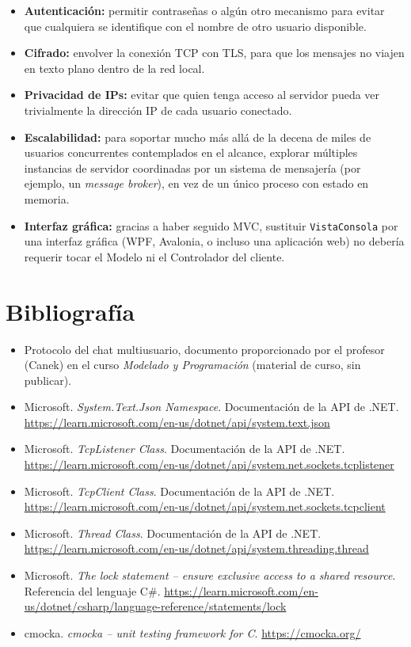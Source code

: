 \documentclass[11pt,letterpaper]{article}
\begin{document}
\begin{itemize}
  \item \textbf{Autenticación:} permitir contraseñas o algún otro mecanismo
        para evitar que cualquiera se identifique con el nombre de otro
        usuario disponible.
  \item \textbf{Cifrado:} envolver la conexión TCP con TLS, para que los
        mensajes no viajen en texto plano dentro de la red local.
  \item \textbf{Privacidad de IPs:} evitar que quien tenga acceso al
        servidor pueda ver trivialmente la dirección IP de cada usuario
        conectado.
  \item \textbf{Escalabilidad:} para soportar mucho más allá de la decena
        de miles de usuarios concurrentes contemplados en el alcance,
        explorar múltiples instancias de servidor coordinadas por un
        sistema de mensajería (por ejemplo, un \emph{message broker}), en
        vez de un único proceso con estado en memoria.
  \item \textbf{Interfaz gráfica:} gracias a haber seguido MVC, sustituir
        \texttt{VistaConsola} por una interfaz gráfica (WPF, Avalonia, o
        incluso una aplicación web) no debería requerir tocar el Modelo ni
        el Controlador del cliente.
\end{itemize}

\section{Bibliografía}

\begin{itemize}
  \item Protocolo del chat multiusuario, documento proporcionado por el
        profesor (Canek) en el curso \emph{Modelado y Programación}
        (material de curso, sin publicar).
  \item Microsoft. \emph{System.Text.Json Namespace}. Documentación de la
        API de .NET.
        \url{https://learn.microsoft.com/en-us/dotnet/api/system.text.json}
  \item Microsoft. \emph{TcpListener Class}. Documentación de la API de
        .NET.
        \url{https://learn.microsoft.com/en-us/dotnet/api/system.net.sockets.tcplistener}
  \item Microsoft. \emph{TcpClient Class}. Documentación de la API de
        .NET.
        \url{https://learn.microsoft.com/en-us/dotnet/api/system.net.sockets.tcpclient}
  \item Microsoft. \emph{Thread Class}. Documentación de la API de .NET.
        \url{https://learn.microsoft.com/en-us/dotnet/api/system.threading.thread}
  \item Microsoft. \emph{The lock statement -- ensure exclusive access to a
        shared resource}. Referencia del lenguaje C\#.
        \url{https://learn.microsoft.com/en-us/dotnet/csharp/language-reference/statements/lock}
  \item cmocka. \emph{cmocka -- unit testing framework for C}.
        \url{https://cmocka.org/}
\end{itemize}
\end{document}
